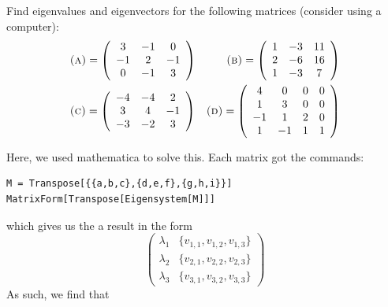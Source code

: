 \documentclass[11pt,answers]{exam}
\begin{document}
\begin{questions}

\addtocounter{question}{35}
\item Find eigenvalues and eigenvectors for the following matrices (consider using a computer):
\begin{align*}
&\hbox{\textsc{(a)}} = \left(\begin{array}{ccc} 3 & -1 & 0 \\ -1 & 2 & -1 \\ 0 & -1 & 3 \end{array}\right)  &\hbox{\textsc{(b)}} = \left(\begin{array}{ccc} 1 & -3 & 11 \\ 2 & -6 & 16 \\ 1 & -3 & 7 \end{array}\right) \\ &\hbox{\textsc{(c)}} = \left(\begin{array}{ccc} -4 & -4 & 2 \\ 3 & 4 & -1 \\ -3 & -2 & 3 \end{array}\right)  &\textsc{(d)} = \left(\begin{array}{cccc} 4 & 0 & 0 & 0 \\ 1 & 3 & 0 & 0 \\ -1 & 1 & 2 & 0 \\ 1 & -1 & 1 & 1 \end{array}\right)
\end{align*}
\begin{solution}
Here, we used mathematica to solve this.  Each matrix got the commands:
\begin{verbatim}
M = Transpose[{{a,b,c},{d,e,f},{g,h,i}}]
MatrixForm[Transpose[Eigensystem[M]]]
\end{verbatim}
which gives us the a result in the form
\[
\left(\begin{array}{cc} \lambda_1 & \{v_{1,1}, v_{1,2}, v_{1,3}\} \\ \lambda_2 & \{v_{2,1}, v_{2,2}, v_{2,3}\} \\ \lambda_3 & \{v_{3,1}, v_{3,2}, v_{3,3}\}  \end{array}\right)
\]
As such, we find that


\end{solution}
\end{questions}
\end{document}
